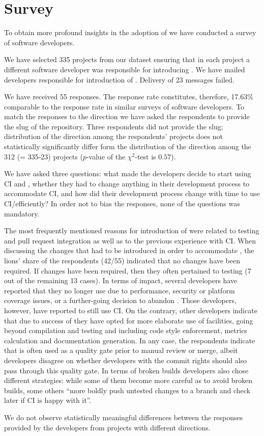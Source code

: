 \section{Survey}
\label{sec:survey}
To obtain more profound insights in the adoption of \Tvis we have conducted a survey of software developers.

We have  selected 335 projects from our dataset ensuring that in each project a different software  developer was responsible for introducing \Tvis. 
We have mailed developers responsible for introduction of \Tvis. Delivery of 23 messages failed.

We have received 55 responses.  
The response rate constitutes, therefore, 17.63\% comparable to the response rate in similar surveys of \GH software developers.
To match the responses to the direction  we have asked the respondents to provide the slug of the \GH repository.
Three respondents did not provide the slug; distribution of the direction among the respondents' projects does not statistically significantly differ form the distribution of the direction among the 312 (= 335-23) projects ($p$-value of the $\chi^2$-test is $0.57$).

We have asked three questions: what made the developers decide to start using CI and \Tvis, whether they had to change anything in their development process to accommodate CI, and how did their development process change with time to use CI/\Tvis efficiently?
In order not to bias the responses, none of the questions was mandatory.

The most frequently mentioned reasons for introduction of \Tvis were related to testing and pull request integration as well as to the previous experience with CI.
When discussing the changes that had to be introduced in order to accommodate \Tvis, the lions' share of the respondents (42/55)  indicated that no changes have been required. If changes have been required, then they often pertained to testing (7 out of the remaining 13 cases).
In terms of impact, several developers have reported that they no longer use \Tvis due to performance, security or platform coverage issues, or a further-going decision to abandon \GH. 
Those developers, however, have reported to still use CI.
On the contrary, other developers indicate that due to success of \Tvis they have opted for more elaborate use of \Tvis facilities, going beyond compilation and testing and including code style enforcement, metrics calculation and documentation generation.  
In any case, the respondents indicate that \Tvis is often used as a quality gate prior to manual review or merge, albeit developers disagree on whether developers with the commit rights should also pass through this quality gate.
In terms of broken builds developers also chose different strategies: while some of them become more careful as to avoid broken builds, some others ``more boldly push untested changes to a branch and check later if CI is happy with it''.

We do not observe statistically meaningful differences between the responses provided by the developers from projects with different directions.